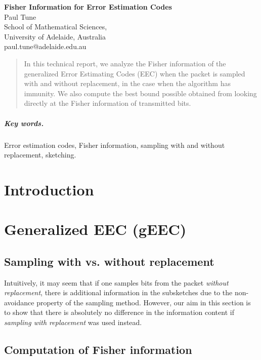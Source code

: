 \documentclass[12pt]{article}
\numberwithin{equation}{section}
\numberwithin{table}{section}
\numberwithin{figure}{section}
\begin{document}

\begin{center}
\textbf{\Large Fisher Information for Error Estimation Codes} \\[6pt]
  Paul Tune \\[6pt]
  School of Mathematical Sciences,\\
  University of Adelaide, Australia  \\[6pt]
  paul.tune@adelaide.edu.au
\end{center}

\begin{abstract}
In this technical report, we analyze the Fisher information of the generalized Error Estimating Codes (EEC) when the packet is sampled with 
and without replacement, in the case when the algorithm has immunity. We also compute the best bound possible obtained from looking 
directly at the Fisher information of transmitted bits.
\end{abstract}

\subparagraph{Key words.} Error estimation codes, Fisher information, sampling with and without replacement,
sketching.


\section{Introduction}


\section{Generalized EEC (gEEC)}

\subsection{Sampling with vs. without replacement}

Intuitively, it may seem that if one samples bits from the packet \textit{without replacement}, there is additional information in the subsketches 
due to the non-avoidance property of the sampling method. However, our aim in this section is to show that there is absolutely no difference
in the information content if \textit{sampling with replacement} was used instead.


\subsection{Computation of Fisher information}
\end{document}
